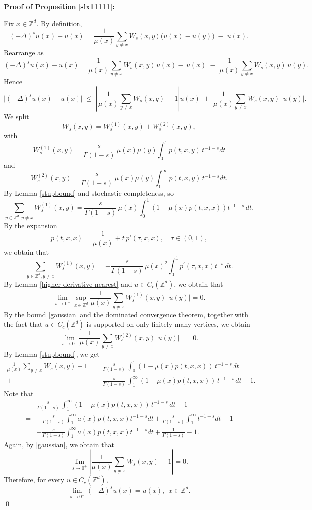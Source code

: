 \documentclass[reqno,12pt]{amsart}
\numberwithin{equation}{section}
\begin{document}
\noindent \textbf{Proof of Proposition \ref{slx11111}:}


	Fix \(x\in\mathbb{Z}^d\).  By definition,
	\[
	(-\Delta)^s u(x)-u(x)
	=\frac{1}{\mu(x)}\sum_{y\ne x}W_s(x,y)\bigl(u(x)-u(y)\bigr)\;-\;u(x).
	\]
	Rearrange as
	\[
	(-\Delta)^s u(x)-u(x)
	=\frac{1}{\mu(x)}\sum_{y\ne x}W_s(x,y)\,u(x)
	-\,u(x)
	\;-\;
	\frac{1}{\mu(x)}\sum_{y\ne x}W_s(x,y)\,u(y).
	\]
	Hence
	\[
	\bigl|(-\Delta)^s u(x)-u(x)\bigr|
	\;\le\;
	\left|\frac{1}{\mu(x)}\sum_{y\ne x}W_s(x,y)\,
	-1\right|u(x)
	\;+\;
	\frac{1}{\mu(x)}
	\sum_{y\ne x}W_s(x,y)\,\bigl|u(y)\bigr|.
	\]
	We split
	\[
	W_s(x,y)
	= W_s^{(1)}(x,y) + W_s^{(2)}(x,y),
	\]
	with
	\[
	W_s^{(1)}(x,y)=\frac{s}{\Gamma(1-s)}\,\mu(x)\mu(y)\int_0^1 p(t,x,y)\,t^{-1-s}dt\]
	and
	\[W_s^{(2)}(x,y)=\frac{s}{\Gamma(1-s)}\,\mu(x)\mu(y)\int_1^\infty p(t,x,y)\,t^{-1-s}dt.
	\]
	By Lemma \ref{stupbound} and stochastic completeness, so
	\[
	\sum_{y\in\mathbb{Z}^d,y\ne x}W_s^{(1)}(x,y)
	=\frac{s}{\Gamma(1-s)}\,\mu(x)\int_0^1\left(1-\mu(x)p(t,x,x)\right)t^{-1-s}\,dt.
	\]
	By the expansion
	\begin{equation}\label{taly1}
		p(t,x,x) = \frac{1}{\mu(x)} + t\,p'(\tau,x,x), \quad \tau \in (0,1),
	\end{equation}
	we obtain that
	\begin{equation}\label{ws11}
		\sum_{y\in\mathbb{Z}^d,y\ne x}W_s^{(1)}(x,y)
		=-\frac{s}{\Gamma(1-s)}\,\mu(x)^2\int_0^1p^{\prime}\left(\tau,x,x\right)t^{-s}\,dt.
	\end{equation}
	By Lemma \ref{higher‐derivative-nearest} and $u\in C_c\left(\mathbb{Z}^d\right)$, we obtain that	
	\[\lim\limits_{s\rightarrow 0^+}\sup_{x\in \mathbb{Z}^d}\frac{1}{\mu(x)}
	\sum_{y\ne x} W_s^{(1)}(x,y)\,\bigl|u(y)\bigr|=0.\]
	By the bound \eqref{gaussian} and the dominated convergence theorem, together with the fact that \(u\in C_c(\mathbb{Z}^d)\) is supported on only finitely many vertices, we obtain
	\[
	\lim_{s\to 0^+}\frac{1}{\mu(x)}
	\sum_{y\neq x} W_s^{(2)}(x,y)\,\bigl|u(y)\bigr| \;=\; 0.
	\]
	By Lemma \ref{stupbound}, we get
	\[
	\begin{aligned}
		\frac{1}{\mu(x)}\sum_{y\neq x}W_s(x,y)-1=&\frac{s}{\Gamma(1-s)}\,
		\int_0^{1}\left(1-\mu(x)p(t,x,x)\right)\,t^{-1-s}\,dt\\+&\frac{s}{\Gamma(1-s)}\,
		\int_1^{\infty}\left(1-\mu(x)p(t,x,x)\right)\,t^{-1-s}\,dt-1.
	\end{aligned}
	\]
	Note that
	\[\begin{aligned}
		&	\frac{s}{\Gamma(1-s)}\,
		\int_1^{\infty}\left(1-\mu(x)p(t,x,x)\right)\,t^{-1-s}\,dt-1\\=&-\frac{s}{\Gamma\left(1-s\right)}\int_{1}^{\infty}\mu(x)p(t,x,x)t^{-1-s}dt+\frac{s}{\Gamma(1-s)}\int_1^{\infty}t^{-1-s}dt-1\\=&-\frac{s}{\Gamma\left(1-s\right)}\int_{1}^{\infty}\mu(x)p(t,x,x)t^{-1-s}dt+\frac{1}{\Gamma(1-s)}-1.
	\end{aligned}\]
	Again, by \eqref{gaussian}, we obtain that 
	\[\lim\limits_{s\rightarrow 0^+}\left|\frac{1}{\mu(x)}\sum_{y\ne x}W_s(x,y)\,
	-1\right|=0.\]
	Therefore, for every \(u\in C_c(\mathbb{Z}^d)\), 
	\[
	\lim_{s\to0^+}(-\Delta)^s u(x) = u(x),\:\:x\in \mathbb{Z}^d.
	\]
\qed
\end{document}
